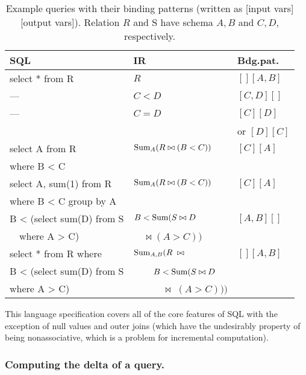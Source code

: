 \begin{table}
\begin{center}
\begin{scriptsize}
\begin{tabular}{|l|l|l|}
\hline
SQL & IR & Bdg.pat. \\
\hline
select * from R   & $R$ & $[][A,B]$ \\
--- & $C < D$ & $[C,D][]$ \\
--- & $C = D$ & $[C][D]$ \\
&& or $[D][C]$
\\[1ex]
select A from R   & $\mbox{Sum}_A(R \bowtie (B < C))$ & $[C][A]$ \\
where B < C       &&
\\[1ex]
select A, sum(1) from R  & $\mbox{Sum}_A(R \bowtie (B < C))$ & $[C][A]$ \\
where B < C group by A &&
\\[1ex]
B < (select sum(D) from S & $B < \mbox{Sum}(S \bowtie D$ & $[A,B][]$ \\
~~where A > C) & ~~$\bowtie (A > C))$ &
\\[1ex]
select * from R where & $\mbox{Sum}_{A,B}(R \; \bowtie$ & $[][A,B]$ \\
B < (select sum(D) from S & ~~~~$B < \mbox{Sum}(S \bowtie D$ & \\
where A > C) & ~~~~~~$\bowtie\; (A > C)))$ & \\
\hline
\end{tabular}
\end{scriptsize}
\end{center}

\vspace{-5mm}

\caption{Example queries with their binding patterns (written as [input vars][output vars]). Relation $R$ and S have schema $A,B$ and $C,D$, respectively.}
\label{tab:ir-examples}
\end{table}


\medskip



This language specification covers all of the core features of SQL with the exception of
null values and outer joins (which have the undesirably property of being nonassociative, which is a problem for incremental computation).



\subsubsection{Computing the delta of a query.}

